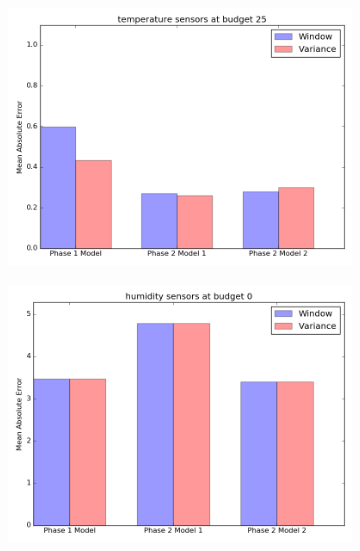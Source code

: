 \documentclass{article}
\begin{document}
\begin{figure}[h!]
	\begin{subfigure}{\linewidth}
	\includegraphics[scale=0.5]{temperature_25.png}
	\end{subfigure}
	\begin{subfigure}{\linewidth}
	\includegraphics[scale=0.5]{humidity_0.png}
	\end{subfigure}
\end{figure}

\newpage
\end{document}
